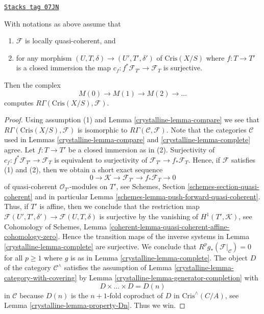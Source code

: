 \begin{proposition}
\label{crystalline-proposition-compute-cohomology}
\href{https://stacks.math.columbia.edu/tag/07JN}{\texttt{Stacks tag 07JN}}

With notations as above assume that
\begin{enumerate}
\item $\mathcal{F}$ is locally quasi-coherent, and
\item for any morphism $(U, T, \delta) \to (U', T', \delta')$
of $\text{Cris}(X/S)$ where $f : T \to T'$ is a closed immersion
the map $c_f : f^*\mathcal{F}_{T'} \to \mathcal{F}_T$ is surjective.
\end{enumerate}
Then the complex
$$
M(0) \to M(1) \to M(2) \to \ldots
$$
computes $R\Gamma(\text{Cris}(X/S), \mathcal{F})$.
\end{proposition}

\begin{proof}

Using assumption (1) and Lemma \ref{crystalline-lemma-compare} we see that
$R\Gamma(\text{Cris}(X/S), \mathcal{F})$ is isomorphic to
$R\Gamma(\mathcal{C}, \mathcal{F})$. Note that the categories
$\mathcal{C}$ used in Lemmas \ref{crystalline-lemma-compare} and \ref{crystalline-lemma-complete}
agree. Let $f : T \to T'$ be a closed immersion as in (2). Surjectivity
of $c_f : f^*\mathcal{F}_{T'} \to \mathcal{F}_T$ is equivalent to
surjectivity of $\mathcal{F}_{T'} \to f_*\mathcal{F}_T$. Hence, if
$\mathcal{F}$ satisfies (1) and (2), then we obtain a short exact sequence
$$
0 \to \mathcal{K} \to \mathcal{F}_{T'} \to f_*\mathcal{F}_T \to 0
$$
of quasi-coherent $\mathcal{O}_{T'}$-modules on $T'$, see
Schemes, Section \ref{schemes-section-quasi-coherent} and in particular
Lemma \ref{schemes-lemma-push-forward-quasi-coherent}.
Thus, if $T'$ is affine, then we conclude that the restriction map
$\mathcal{F}(U', T', \delta') \to \mathcal{F}(U, T, \delta)$
is surjective by the vanishing of $H^1(T', \mathcal{K})$, see
Cohomology of Schemes, Lemma
\ref{coherent-lemma-quasi-coherent-affine-cohomology-zero}.
Hence the transition maps of the inverse systems in Lemma \ref{crystalline-lemma-complete}
are surjective. We conclude that
$R^pg_*(\mathcal{F}|_\mathcal{C}) = 0$ for all $p \geq 1$
where $g$ is as in Lemma \ref{crystalline-lemma-complete}.
The object $D$ of the category $\mathcal{C}^\wedge$
satisfies the assumption of Lemma \ref{crystalline-lemma-category-with-covering} by
Lemma \ref{crystalline-lemma-generator-completion}
with
$$
D \times \ldots \times D = D(n)
$$
in $\mathcal{C}$ because $D(n)$ is the $n + 1$-fold coproduct of
$D$ in $\text{Cris}^\wedge(C/A)$, see Lemma \ref{crystalline-lemma-property-Dn}.
Thus we win.
\end{proof}

